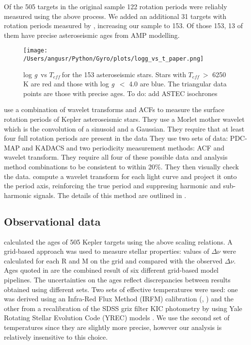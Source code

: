 \documentclass[10pt,preprint]{aastex}
\newcommand{\logg}{log \emph{g}~}
\newcommand{\teff}{$T_{eff}~$}
\begin{document}
Of the 505 targets in the original sample 122 rotation periods were reliably measured using the above process.
We added an additional 31 targets with rotation periods measured by \citet{McQuillan_2014}, increasing our sample to 153.
Of those 153, 13 of them have precise asteroseismic ages from AMP modelling.

\begin{figure}[ht]
\begin{center}
\texttt{[image: /Users/angusr/Python/Gyro/plots/logg\_vs\_t\_paper.png]}
\caption{\logg vs \teff for the 153 asteroseismic stars. Stars with \teff $>$ 6250 K are red and those with \logg $<$ 4.0 are blue. The triangular data points are those with precise ages. {\color{red}To do: add ASTEC isochrones}}
\label{fig:p_vs_a}
\end{center}
\end{figure}

\citet{Garcia2014} use a combination of wavelet transforms and ACFs to measure the surface rotation periods of Kepler asteroseismic stars.
They use a Morlet mother wavelet which is the convolution of a sinusoid and a Gaussian.
They require that at least four full rotation periods are present in the data
They use two sets of data: PDC-MAP and KADACS and two periodicity measurement methods: ACF and wavelet transform.
They require all four of these possible data and analysis method combinations to be consistent to within 20\%.
They then visually check the data.
compute a wavelet transform for each light curve and project it onto the period axis, reinforcing the true period and suppresing harmonic and sub-harmonic signals.
The details of this method are outlined in \citet{Mathur2014}.

\subsection{Observational data}

\citet{Chaplin2013} calculated the ages of 505 Kepler targets using the above scaling relations.
A grid-based approach was used to measure stellar properties: values of $\Delta\nu$ were calculated for each R and M on the grid and compared with the observed $\Delta\nu$.
Ages quoted in \citet{Chaplin2013} are the combined result of six different grid-based model pipelines.
The uncertainties on the ages reflect discrepancies between results obtained using different sets.
Two sets of effective temperatures were used: one was derived using an Infra-Red Flux Method (IRFM) calibration (\citealt{Casagrande2010}, \citealt{SilvaAguirre2012}) and the other from a recalibration of the SDSS griz filter KIC photometry by \citet{Pinsonneault2012} using Yale Rotating Stellar Evolution Code (YREC) models \citep{Demarque2004}.
We use the second set of temperatures since they are slightly more precise, however our analysis is relatively insensitive to this choice.
\end{document}
